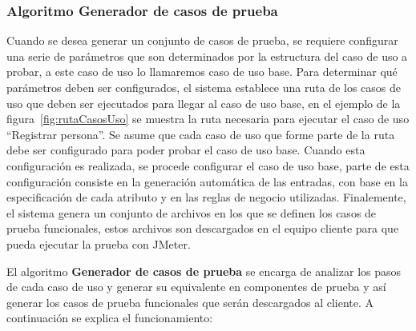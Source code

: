 	\newpage

	\subsubsection{Algoritmo Generador de casos de prueba}
	
	Cuando se desea generar un conjunto de casos de prueba, se requiere configurar una serie de parámetros que son determinados por la estructura del caso de uso a probar, a este caso de uso lo llamaremos caso de uso base. Para determinar qué parámetros deben ser configurados, el sistema establece una ruta de los casos de uso que deben ser ejecutados para llegar al caso de uso base, en el ejemplo de la figura~\ref{fig:rutaCasosUso} se muestra la ruta necesaria para ejecutar el caso de uso ``Registrar persona''. Se asume que cada caso de uso que forme parte de la ruta debe ser configurado para poder probar el caso de uso base. Cuando esta configuración es realizada, se procede configurar el caso de uso base, parte de esta configuración consiste en la generación automática de las entradas, con base en la especificación de cada atributo y en las reglas de negocio utilizadas. Finalemente, el sistema genera un conjunto de archivos en los que se definen los casos de prueba funcionales, estos archivos son descargados en el equipo cliente para que pueda ejecutar la prueba con JMeter.
	
	
	
	El algoritmo {\bf Generador de casos de prueba} se encarga de analizar los pasos de cada caso de uso y generar su equivalente en  componentes de prueba y así generar los casos de prueba funcionales que serán descargados al cliente. A continuación se explica el funcionamiento:\\
		
